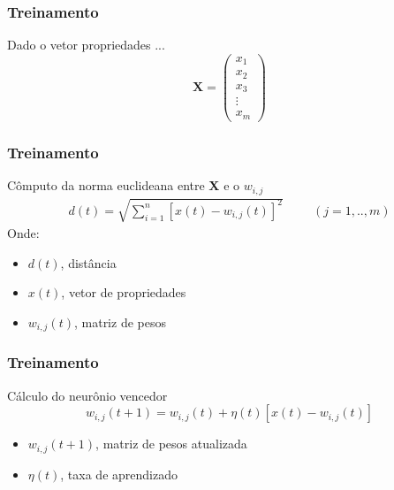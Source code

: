 \documentclass[10pt]{beamer} %
\begin{document}
\begin{frame}
	\frametitle{Treinamento}

\begin{block}{Dado o vetor propriedades ...}
 \begin{displaymath}
 \mathbf{X}=\left(\begin{array}{r}
x_{1}\\
x_{2}\\
x_{3}\\
  \vdots \\
x_{m}
 \end{array}\right)
 \label{inicio}
 \end{displaymath}
\end{block}
\end{frame}

\begin{frame}
	\frametitle{Treinamento}
	\begin{block}{Cômputo da norma euclideana entre \textbf{X} e o  $w_{i,j}$}
		 \begin{eqnarray}
		 d(t)= \sqrt{\sum^{n}_{i=1}[x(t)-w_{i,j}(t)]^{2}} \hspace{1cm}  (j = {1,..,m}) 
		 \label{euclidiana}
		 \end{eqnarray}
		 Onde:
	\end{block}
	\begin{itemize}
		\pause
		\item $d(t)$, distância 
		\pause
		\item $x(t)$, vetor de propriedades
		\pause
		\item $w_{i,j}(t)$, matriz de pesos
	\end{itemize}
\end{frame}

\begin{frame}
	\frametitle{Treinamento}
	\begin{block}{Cálculo do neurônio vencedor}
	\begin{equation}
	w_{i,j}(t+1)=w_{i,j}(t)+\eta(t)[x(t)-w_{i,j}(t)] 
	\label{ajuste de pesos}
	\end{equation}
	\end{block}
		\begin{itemize}
			\pause
			\item $w_{i,j}(t+1)$, matriz de pesos atualizada
			\pause
			\item $\eta(t)$,  taxa de aprendizado
		\end{itemize}
\end{frame}
\end{document}
